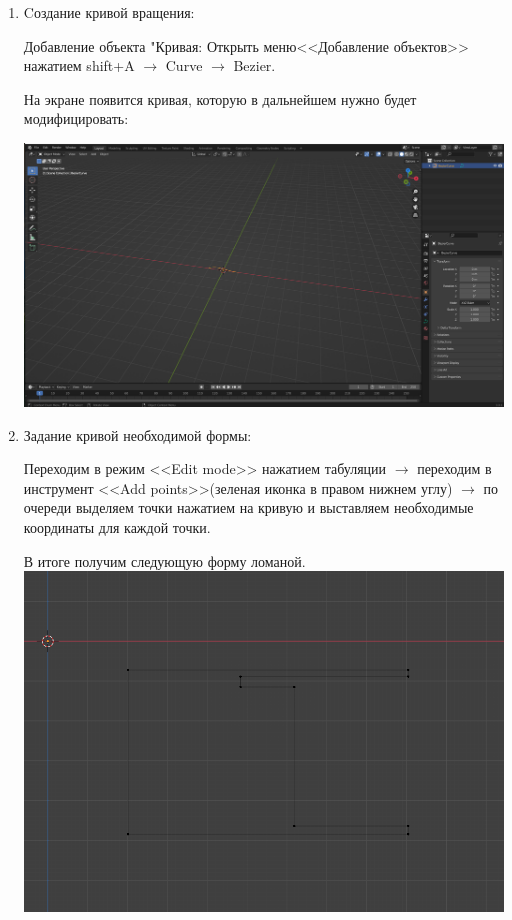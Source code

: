 \documentclass[12pt]{article}
\begin{document}
\begin{enumerate}
\item Cоздание кривой вращения:

Добавление объекта "Кривая: 
Открыть меню<<Добавление объектов>> нажатием shift+A   $\to $  Curve  $\to $ Bezier.

На экране появится кривая, которую в дальнейшем нужно будет модифицировать:


\vskip 1cm
{
    \centering
    \includegraphics[width=1\linewidth]{кривая1.png}
    \label{fig:i1}
}
\vskip 1cm


\item Задание кривой необходимой формы:

Переходим в режим <<Edit mode>> нажатием табуляции  $\to $   переходим в инструмент <<Add points>>(зеленая иконка в правом нижнем углу)  $\to $ по очереди выделяем точки  нажатием на кривую и выставляем необходимые координаты для каждой точки.

В итоге получим следующую форму ломаной.
\vskip 1cm
{
    \centering
    \includegraphics[width=1\linewidth]{форма_катушки.png}
    \label{fig:i1}
}
\vskip 1cm



\end{enumerate}
\end{document}
